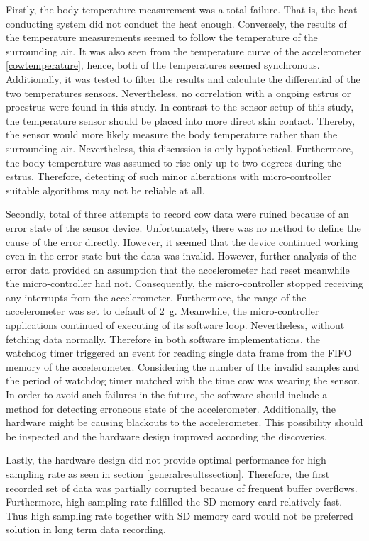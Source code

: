 \documentclass[english,12pt,a4paper,pdftex,elec,utf8]{aaltothesis}
\begin{document}
Firstly, the body temperature measurement was a total failure. That is, the heat conducting system did not conduct the heat enough. Conversely, the results of the temperature measurements seemed to follow the temperature of the surrounding air. It was also seen from the temperature curve of the accelerometer \ref{cowtemperature}, hence, both of the temperatures seemed synchronous. Additionally, it was tested to filter the results and calculate the differential of the two temperatures sensors. Nevertheless, no correlation with a ongoing estrus or proestrus were found in this study. In contrast to the sensor setup of this study, the temperature sensor should be placed into more direct skin contact. Thereby, the sensor would more likely measure the body temperature rather than the surrounding air. Nevertheless, this discussion is only hypothetical. Furthermore, the body temperature was assumed to rise only up to two degrees during the estrus. Therefore, detecting of such minor alterations with micro-controller suitable algorithms may not be reliable at all.

Secondly, total of three attempts to record cow data were ruined because of an error state of the sensor device. Unfortunately, there was no method to define the cause of the error directly. However, it seemed that the device continued working even in the error state but the data was invalid. However, further analysis of the error data provided an assumption that the accelerometer had reset meanwhile the micro-controller had not. Consequently, the micro-controller stopped receiving any interrupts from the accelerometer. Furthermore, the range of the accelerometer was set to default of \SI{2}{\gram}. Meanwhile, the micro-controller applications continued of executing of its software loop. Nevertheless, without fetching data normally. Therefore in both software implementations, the watchdog timer triggered an event for reading single data frame from the FIFO memory of the accelerometer. Considering the number of the invalid samples and the period of watchdog timer matched with the time cow was wearing the sensor. In order to avoid such failures in the future, the software should include a method for detecting erroneous state of the accelerometer. Additionally, the hardware might be causing blackouts to the accelerometer. This possibility should be inspected and the hardware design improved according the discoveries.

Lastly, the hardware design did not provide optimal performance for high sampling rate as seen in section \ref{generalresultssection}. Therefore, the first recorded set of data was partially corrupted because of frequent buffer overflows. Furthermore, high sampling rate fulfilled the SD memory card relatively fast. Thus high sampling rate together with SD memory card would not be preferred solution in long term data recording. 
\end{document}
